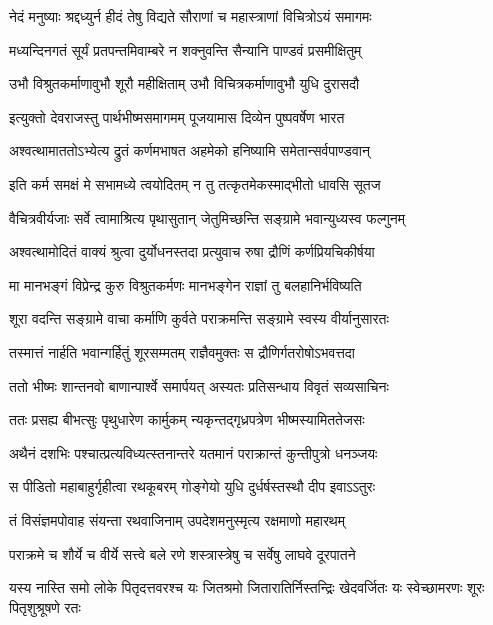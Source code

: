 \twolineshloka
{नेदं मनुष्याः श्रद्दध्युर्न हीदं तेषु विद्यते}
{सौराणां च महास्त्राणां विचित्रोऽयं समागमः}


\twolineshloka
{मध्यन्दिनगतं सूर्यं प्रतपन्तमिवाम्बरे}
{न शक्नुवन्ति सैन्यानि पाण्डवं प्रसमीक्षितुम्}


\twolineshloka
{उभौ विश्रुतकर्माणावुभौ शूरौ महीक्षिताम्}
{उभौ विचित्रकर्माणावुभौ युधि दुरासदौ}


\twolineshloka
{इत्युक्तो देवराजस्तु पार्थभीष्मसमागमम्}
{पूजयामास दिव्येन पुष्पवर्षेण भारत}


\twolineshloka
{अश्वत्थामाततोऽभ्येत्य द्रुतं कर्णमभाषत}
{अहमेको हनिष्यामि समेतान्सर्वपाण्डवान्}


\twolineshloka
{इति कर्म समक्षं मे सभामध्ये त्वयोदितम्}
{न तु तत्कृतमेकस्माद्भीतो धावसि सूतज}


\twolineshloka
{वैचित्रवीर्यजाः सर्वे त्वामाश्रित्य पृथासुतान्}
{जेतुमिच्छन्ति सङ्ग्रामे भवान्युध्यस्व फल्गुनम्}


\twolineshloka
{अश्वत्थामोदितं वाक्यं श्रुत्वा दुर्योधनस्तदा}
{प्रत्युवाच रुषा द्रौणिं कर्णप्रियचिकीर्षया}


\twolineshloka
{मा मानभङ्गं विप्रेन्द्र कुरु विश्रुतकर्मणः}
{मानभङ्गेन राज्ञां तु बलहानिर्भविष्यति}


\twolineshloka
{शूरा वदन्ति सङ्ग्रामे वाचा कर्माणि कुर्वते}
{पराक्रमन्ति सङ्ग्रामे स्वस्य वीर्यानुसारतः}


\twolineshloka
{तस्मात्तं नार्हति भवान्गर्हितुं शूरसम्मतम्}
{राज्ञैवमुक्तः स द्रौणिर्गतरोषोऽभवत्तदा}


\twolineshloka
{ततो भीष्मः शान्तनवो बाणान्पार्श्वे समार्पयत्}
{अस्यतः प्रतिसन्धाय विवृतं सव्यसाचिनः}


\twolineshloka
{ततः प्रसह्य बीभत्सुः पृथुधारेण कार्मुकम्}
{न्यकृन्तद्गृध्रपत्रेण भीष्मस्यामिततेजसः}


\twolineshloka
{अथैनं दशभिः पश्चात्प्रत्यविध्यत्स्तनान्तरे}
{यतमानं पराक्रान्तं कुन्तीपुत्रो धनञ्जयः}


\twolineshloka
{स पीडितो महाबाहुर्गृहीत्वा रथकूबरम्}
{गोङ्गेयो युधि दुर्धर्षस्तस्थौ दीप इवाऽऽतुरः}


\twolineshloka
{तं विसंज्ञमपोवाह संयन्ता रथवाजिनाम्}
{उपदेशमनुस्मृत्य रक्षमाणो महारथम्}


\twolineshloka
{पराक्रमे च शौर्ये च वीर्ये सत्त्वे बले रणे}
{शस्त्रास्त्रेषु च सर्वेषु लाघवे दूरपातने}


\threelineshloka
{यस्य नास्ति समो लोके पितृदत्तवरश्च यः}
{जितश्रमो जितारातिर्निस्तन्द्रिः खेदवर्जितः}
{यः स्वेच्छामरणः शूरः पितृशुश्रूषणे रतः}


